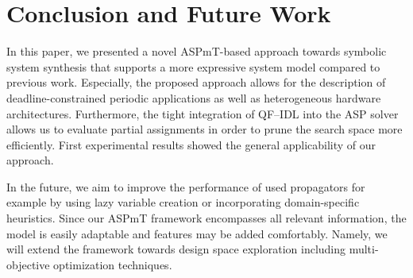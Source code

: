\section{Conclusion and Future Work}
\label{sec:conclusion}
In this paper, we presented a novel ASPmT-based approach towards symbolic system synthesis that supports a more expressive system model compared to previous work. Especially, the proposed approach allows for the description of deadline-constrained periodic applications as well as heterogeneous hardware architectures.
Furthermore, the tight integration of QF--IDL into the ASP solver allows us to evaluate partial assignments in order to prune the search space more efficiently. 
First experimental results showed the general applicability of our approach. 

In the future, we aim to improve the performance of used propagators for example by using lazy variable creation or incorporating domain-specific heuristics. 
Since our ASPmT framework encompasses all relevant information,
the model is easily adaptable and features may be added comfortably.
Namely, we will extend the framework towards design space exploration including multi-objective optimization techniques.
